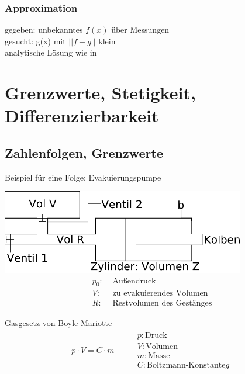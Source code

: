\subsubsection{Approximation}

gegeben: unbekanntes $f(x)$ über Messungen \\
gesucht: g(x) mit $|| f - g ||$ klein \\
analytische Lösung wie in \pageref{interpolation} \\

\section{Grenzwerte, Stetigkeit, Differenzierbarkeit}
\subsection{Zahlenfolgen, Grenzwerte}


\begin{minipage}{1\textwidth}
Beispiel für eine Folge: Evakuierungspumpe
\begin{center}
\includegraphics[width=0.8\textwidth]{evakuierungspumpe.pdf}
\begin{align*}
p_0: &\text{ Außendruck} \\
V: &\text{ zu evakuierendes Volumen} \\
R: &\text{ Restvolumen des Gestänges}
\end{align*}
\end{center}
\end{minipage}

\begin{theorem} Gasgesetz von Boyle-Mariotte
\begin{align*}
p \cdot V = C \cdot m &&
\begin{aligned}
&p: \text{Druck} \\
&V: \text{Volumen} \\
&m: \text{Masse} \\
&C: \text{Boltzmann-Konstante}g
\end{aligned}
\end{align*}
\end{theorem}


